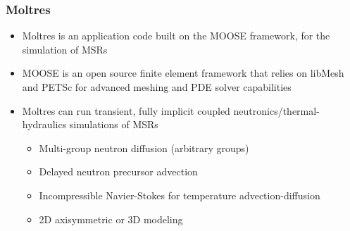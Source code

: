 \begin{frame}
	\frametitle{Moltres}
		\begin{itemize}
			\item Moltres is an application code built on the \gls{MOOSE}
			framework, for the simulation of \glspl{MSR}
			\item MOOSE is an open source finite element framework that
			relies on libMesh and PETSc for advanced meshing and PDE
			solver capabilities
			\item Moltres can run transient, fully implicit coupled
			neutronics/thermal-hydraulics simulations of \glspl{MSR}
			\begin{itemize}
				\item Multi-group neutron diffusion (arbitrary groups)
				\item Delayed neutron precursor advection
				\item Incompressible Navier-Stokes for temperature
				advection-diffusion
				\item 2D axisymmetric or 3D modeling
			\end{itemize}
		\end{itemize}
\end{frame}
